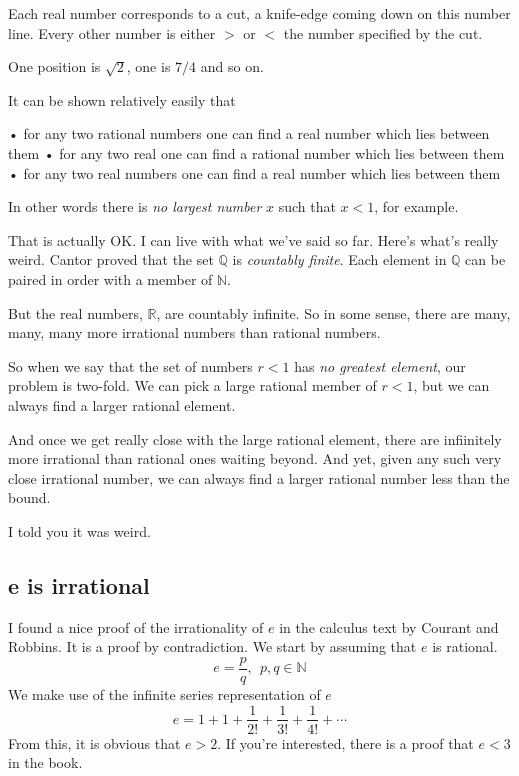 \documentclass[11pt, oneside]{article}
\begin{document}
Each real number corresponds to a cut, a knife-edge coming down on this number line.  Every other number is either $>$ or $<$ the number specified by the cut.

One position is $\sqrt{2}$, one is $7/4$ and so on.

It can be shown relatively easily that

• for any two rational numbers one can find a real number which lies between them
• for any two real one can find a rational number which lies between them
• for any two real numbers one can find a real number which lies between them

In other words there is \emph{no largest number} $x$ such that $x < 1$, for example.

That is actually OK.  I can live with what we've said so far.  Here's what's really weird.  Cantor proved that the set $\mathbb{Q}$ is \emph{countably finite}.  Each element in $\mathbb{Q}$ can be paired in order with a member of $\mathbb{N}$.

But the real numbers, $\mathbb{R}$, are countably infinite.  So in some sense, there are many, many, many more irrational numbers than rational numbers.

So when we say that the set of numbers $r < 1$ has \emph{no greatest element}, our problem is two-fold.  We can pick a large rational member of $r < 1$, but we can always find a larger rational element.  

And once we get really close with the large rational element, there are infiinitely more irrational than rational ones waiting beyond.  And yet, given any such very close irrational number, we can always find a larger rational number less than the bound.

I told you it was weird.

\subsection*{e is irrational}

I found a nice proof of the irrationality of $e$ in the calculus text by Courant and Robbins.  It is a proof by contradiction.  We start by assuming that $e$ is rational.
\[ e = \frac{p}{q}, \ \  p,q \in \mathbb{N} \]
We make use of the infinite series representation of $e$
\[ e = 1 + 1 + \frac{1}{2!}  + \frac{1}{3!} + \frac{1}{4!} + \cdots \]
From this, it is obvious that $e > 2$.  If you're interested, there is a proof that $e < 3$ in the book.  
\end{document}
